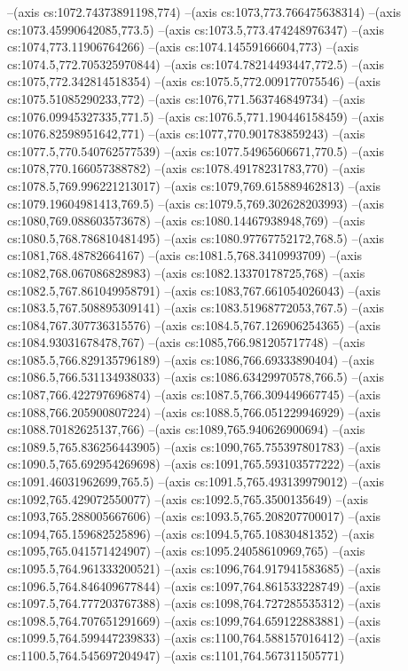 --(axis cs:1072.74373891198,774)
--(axis cs:1073,773.766475638314)
--(axis cs:1073.45990642085,773.5)
--(axis cs:1073.5,773.474248976347)
--(axis cs:1074,773.11906764266)
--(axis cs:1074.14559166604,773)
--(axis cs:1074.5,772.705325970844)
--(axis cs:1074.78214493447,772.5)
--(axis cs:1075,772.342814518354)
--(axis cs:1075.5,772.009177075546)
--(axis cs:1075.51085290233,772)
--(axis cs:1076,771.563746849734)
--(axis cs:1076.09945327335,771.5)
--(axis cs:1076.5,771.190446158459)
--(axis cs:1076.82598951642,771)
--(axis cs:1077,770.901783859243)
--(axis cs:1077.5,770.540762577539)
--(axis cs:1077.54965606671,770.5)
--(axis cs:1078,770.166057388782)
--(axis cs:1078.49178231783,770)
--(axis cs:1078.5,769.996221213017)
--(axis cs:1079,769.615889462813)
--(axis cs:1079.19604981413,769.5)
--(axis cs:1079.5,769.302628203993)
--(axis cs:1080,769.088603573678)
--(axis cs:1080.14467938948,769)
--(axis cs:1080.5,768.786810481495)
--(axis cs:1080.97767752172,768.5)
--(axis cs:1081,768.48782664167)
--(axis cs:1081.5,768.3410993709)
--(axis cs:1082,768.067086828983)
--(axis cs:1082.13370178725,768)
--(axis cs:1082.5,767.861049958791)
--(axis cs:1083,767.661054026043)
--(axis cs:1083.5,767.508895309141)
--(axis cs:1083.51968772053,767.5)
--(axis cs:1084,767.307736315576)
--(axis cs:1084.5,767.126906254365)
--(axis cs:1084.93031678478,767)
--(axis cs:1085,766.981205717748)
--(axis cs:1085.5,766.829135796189)
--(axis cs:1086,766.69333890404)
--(axis cs:1086.5,766.531134938033)
--(axis cs:1086.63429970578,766.5)
--(axis cs:1087,766.422797696874)
--(axis cs:1087.5,766.309449667745)
--(axis cs:1088,766.205900807224)
--(axis cs:1088.5,766.051229946929)
--(axis cs:1088.70182625137,766)
--(axis cs:1089,765.940626900694)
--(axis cs:1089.5,765.836256443905)
--(axis cs:1090,765.755397801783)
--(axis cs:1090.5,765.692954269698)
--(axis cs:1091,765.593103577222)
--(axis cs:1091.46031962699,765.5)
--(axis cs:1091.5,765.493139979012)
--(axis cs:1092,765.429072550077)
--(axis cs:1092.5,765.3500135649)
--(axis cs:1093,765.288005667606)
--(axis cs:1093.5,765.208207700017)
--(axis cs:1094,765.159682525896)
--(axis cs:1094.5,765.10830481352)
--(axis cs:1095,765.041571424907)
--(axis cs:1095.24058610969,765)
--(axis cs:1095.5,764.961333200521)
--(axis cs:1096,764.917941583685)
--(axis cs:1096.5,764.846409677844)
--(axis cs:1097,764.861533228749)
--(axis cs:1097.5,764.777203767388)
--(axis cs:1098,764.727285535312)
--(axis cs:1098.5,764.707651291669)
--(axis cs:1099,764.659122883881)
--(axis cs:1099.5,764.599447239833)
--(axis cs:1100,764.588157016412)
--(axis cs:1100.5,764.545697204947)
--(axis cs:1101,764.567311505771)
